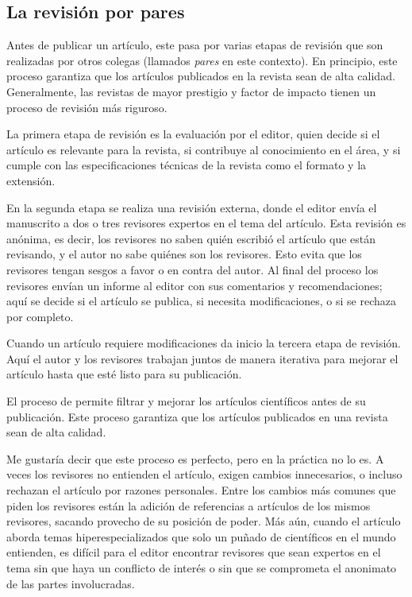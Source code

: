 \subsection*{La revisión por pares}
Antes de publicar un artículo, este pasa por varias etapas de revisión que son
realizadas por otros colegas (llamados \emph{pares} en este contexto).
En principio, este proceso garantiza que los artículos publicados en la
revista sean de alta calidad.
Generalmente, las revistas de mayor prestigio y factor de impacto tienen un
proceso de revisión más riguroso.

La primera etapa de revisión es la evaluación por el editor, quien decide si el
artículo es relevante para la revista, si contribuye al conocimiento en el área,
y si cumple con las especificaciones técnicas de la revista como el formato y
la extensión.

En la segunda etapa se realiza una revisión externa, donde el editor envía el
manuscrito a dos o tres revisores expertos en el tema del artículo.
Esta revisión es anónima, es decir, los revisores no saben quién escribió el
artículo que están revisando, y el autor no sabe quiénes son los revisores.
Esto evita que los revisores tengan sesgos a favor o en contra del autor.
Al final del proceso los revisores envían un informe al editor con sus
comentarios y recomendaciones; aquí se decide si el artículo se publica, si
necesita modificaciones, o si se rechaza por completo.

Cuando un artículo requiere modificaciones da inicio la tercera etapa de
revisión.
Aquí el autor y los revisores trabajan juntos de manera iterativa para mejorar
el artículo hasta que esté listo para su publicación.

\begin{remember}
    El proceso de  permite filtrar y mejorar los
    artículos científicos antes de su publicación.
    Este proceso garantiza que los artículos publicados en una revista sean de
    alta calidad.
\end{remember}

Me gustaría decir que este proceso es perfecto, pero en la práctica no lo es.
A veces los revisores no entienden el artículo, exigen cambios innecesarios, o
incluso rechazan el artículo por razones personales.
Entre los cambios más comunes que piden los revisores están la adición de
referencias a artículos de los mismos revisores, sacando provecho de su posición
de poder.
Más aún, cuando el artículo aborda temas hiperespecializados que solo un puñado
de científicos en el mundo entienden, es difícil para el editor encontrar
revisores que sean expertos en el tema sin que haya un conflicto de interés o
sin que se comprometa el anonimato de las partes involucradas.

